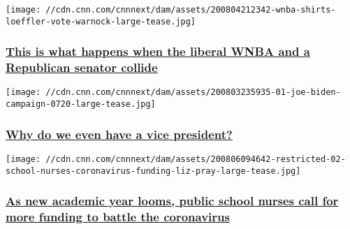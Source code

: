 \href{/2020/08/08/politics/wnba-kelly-loeffler-analysis/index.html}{}

\texttt{[image: //cdn.cnn.com/cnnnext/dam/assets/200804212342-wnba-shirts-loeffler-vote-warnock-large-tease.jpg]}

\hypertarget{this-is-what-happens-when-the-liberal-wnba-and-a-republican-senator-collide}{%
\subsubsection{\texorpdfstring{\href{/2020/08/08/politics/wnba-kelly-loeffler-analysis/index.html}{This
is what happens when the liberal WNBA and a Republican senator
collide}}{This is what happens when the liberal WNBA and a Republican senator collide}}\label{this-is-what-happens-when-the-liberal-wnba-and-a-republican-senator-collide}}

\href{/2020/08/08/politics/what-matters-august-7/index.html}{}

\texttt{[image: //cdn.cnn.com/cnnnext/dam/assets/200803235935-01-joe-biden-campaign-0720-large-tease.jpg]}

\hypertarget{why-do-we-even-have-a-vice-president}{%
\subsubsection{\texorpdfstring{\href{/2020/08/08/politics/what-matters-august-7/index.html}{Why
do we even have a vice
president?}}{Why do we even have a vice president?}}\label{why-do-we-even-have-a-vice-president}}

\href{/2020/08/08/us/school-nurses-coronavirus-funding/index.html}{}

\texttt{[image: //cdn.cnn.com/cnnnext/dam/assets/200806094642-restricted-02-school-nurses-coronavirus-funding-liz-pray-large-tease.jpg]}

\hypertarget{as-new-academic-year-looms-public-school-nurses-call-for-more-funding-to-battle-the-coronavirus}{%
\subsubsection{\texorpdfstring{\href{/2020/08/08/us/school-nurses-coronavirus-funding/index.html}{As
new academic year looms, public school nurses call for more funding to
battle the
coronavirus}}{As new academic year looms, public school nurses call for more funding to battle the coronavirus}}\label{as-new-academic-year-looms-public-school-nurses-call-for-more-funding-to-battle-the-coronavirus}}

